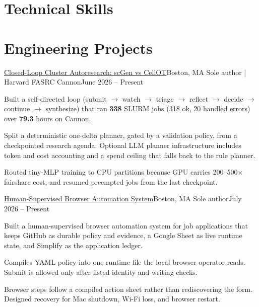 \section{Technical Skills}
\resumeSubHeadingListStart
\resumeSubHeadingListEnd

\section{Engineering Projects}
\resumeSubHeadingListStart

  \resumeSubheading
    {\href{https://github.com/JunyiZhou-Conny/scgen-cellot-autoresearch}{Closed-Loop Cluster Autoresearch: scGen vs CellOT}}{Boston, MA}
    {Sole author | Harvard FASRC Cannon}{June 2026 -- Present}
    \resumeItemListStart
      \item Built a self-directed loop (submit $\rightarrow$ watch $\rightarrow$ triage $\rightarrow$ reflect $\rightarrow$ decide $\rightarrow$ continue $\rightarrow$ synthesize) that ran \textbf{338} SLURM jobs (318 ok, 20 handled errors) over \textbf{79.3} hours on Cannon.
      \item Split a deterministic one-delta planner, gated by a validation policy, from a checkpointed research agenda. Optional LLM planner infrastructure includes token and cost accounting and a spend ceiling that falls back to the rule planner.
      \item Routed tiny-MLP training to CPU partitions because GPU carries 200--500$\times$ fairshare cost, and resumed preempted jobs from the last checkpoint.
    \resumeItemListEnd

  \resumeSubheading
    {\href{https://github.com/JunyiZhou-Conny/job-search-2026-2027-starter}{Human-Supervised Browser Automation System}}{Boston, MA}
    {Sole author}{July 2026 -- Present}
    \resumeItemListStart
      \item Built a human-supervised browser automation system for job applications that keeps GitHub as durable policy and evidence, a Google Sheet as live runtime state, and Simplify as the application ledger.
      \item Compiles YAML policy into one runtime file the local browser operator reads. Submit is allowed only after listed identity and writing checks.
      \item Browser steps follow a compiled action sheet rather than rediscovering the form. Designed recovery for Mac shutdown, Wi-Fi loss, and browser restart.
    \resumeItemListEnd

